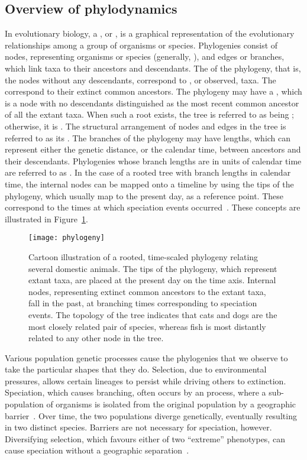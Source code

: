 \subsection{Overview of phylodynamics}

In evolutionary biology, a , or , is a
graphical representation of the evolutionary relationships among a group of
organisms or species. Phylogenies consist of nodes, representing organisms or
species (generally, ), and edges or branches, which link taxa to
their ancestors and descendants. The  of the phylogeny, that is, the
nodes without any descendants, correspond to , or observed, taxa.
The  correspond to their extinct common ancestors. The
phylogeny may have a , which is a node with no descendants
distinguished as the most recent common ancestor of all the extant taxa. When
such a root exists, the tree is referred to as being ; otherwise,
it is . The structural arrangement of nodes and edges in the
tree is referred to as its . The branches of the phylogeny may
have lengths, which can represent either the genetic distance, or the calendar
time, between ancestors and their descendants. Phylogenies whose branch lengths
are in units of calendar time are referred to as . In the
case of a rooted tree with branch lengths in calendar time, the internal nodes
can be mapped onto a timeline by using the tips of the phylogeny, which usually
map to the present day, as a reference point. These 
correspond to the times at which speciation events
occurred~\autocite{nee1992tempo}. These concepts are illustrated in
Figure~\ref{fig:phylogeny}.

\begin{figure}
  \label{fig:phylogeny}
  \texttt{[image: phylogeny]}
  \caption{Cartoon illustration of a rooted, time-scaled phylogeny relating
  several domestic animals. The tips of the phylogeny, which represent extant
  taxa, are placed at the present day on the time axis. Internal nodes,
  representing extinct common ancestors to the extant taxa, fall in the past,
  at branching times corresponding to speciation events. The topology of the
  tree indicates that cats and dogs are the most closely related pair of
  species, whereas fish is most distantly related to any other node in the
  tree.}
\end{figure}

Various population genetic processes cause the phylogenies that we observe to
take the particular shapes that they do. Selection, due to environmental
pressures, allows certain lineages to persist while driving others to
extinction. Speciation, which causes branching, often occurs by an
 process, where a sub-population of organisms is isolated from
the original population by a geographic barrier~\autocite{coyne2004speciation}.
Over time, the two populations diverge genetically, eventually resulting in two
distinct species. Barriers are not necessary for speciation, however.
Diversifying selection, which favours either of two ``extreme'' phenotypes, can
cause  speciation without a geographic
separation~\autocite{coyne2004speciation}.

